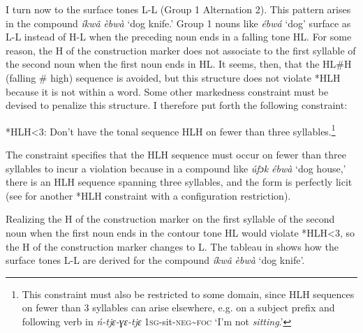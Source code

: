 \documentclass[output=paper]{langscibook}
\begin{document}
I turn now to the surface tones L-L (Group 1 Alternation 2). This pattern arises in the compound \textit{íkwâ} \textit{èbwà} ‘dog knife.’ Group 1 nouns like \textit{ébwá} ‘dog’ surface as L-L instead of H-L when the preceding noun ends in a falling tone HL. For some reason, the H of the construction marker does not associate to the first syllable of the second noun when the first noun ends in HL. It seems, then, that the HL\#H (falling \# high) sequence is avoided, but this structure does not violate *HLH because it is not within a word. Some other markedness constraint must be devised to penalize this structure. I therefore put forth the following constraint: 

\ea \label{ex:glewwe:5}
{*HLH<3: Don’t have the tonal sequence HLH on fewer than three syllables.\footnote{This constraint must also be restricted to some domain, since HLH sequences on fewer than 3 syllables can arise elsewhere, e.g. on a subject prefix and following verb in \textit{ń-tjɛ-ɣɛ-tjɛ} \textsc{1sg-}sit\textsc{-neg{\textasciitilde}foc} ‘I’m not \textit{sitting}.’} }\\
\z

The constraint specifies that the HLH sequence must occur on fewer than three syllables to incur a violation because in a compound like \textit{úfɔk} \textit{ébwà} ‘dog house,’ there is an HLH sequence spanning three syllables, and the form is perfectly licit (see \citealt{McPherson2016c} for another *HLH constraint with a configuration restriction). 

Realizing the H of the construction marker on the first syllable of the second noun when the first noun ends in the contour tone HL would violate *HLH<3, so the H of the construction marker changes to L. The tableau in  shows how the surface tones L-L are derived for the compound \textit{íkwâ} \textit{èbwà} ‘dog knife’.
\end{document}
